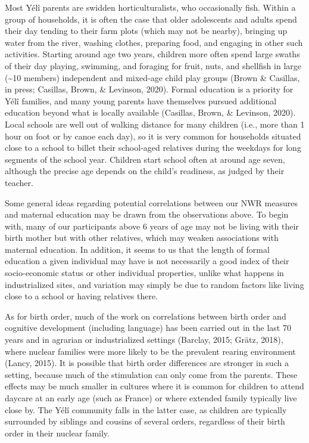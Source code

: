 \documentclass[
  english,
  ,man,floatsintext]{apa6}
\begin{document}
Most Yélî parents are swidden horticulturalists, who occasionally fish. Within a group of households, it is often the case that older adolescents and adults spend their day tending to their farm plots (which may not be nearby), bringing up water from the river, washing clothes, preparing food, and engaging in other such activities. Starting around age two years, children more often spend large swaths of their day playing, swimming, and foraging for fruit, nuts, and shellfish in large (\textasciitilde10 members) independent and mixed-age child play groups (Brown \& Casillas, in press; Casillas, Brown, \& Levinson, 2020). Formal education is a priority for Yélî families, and many young parents have themselves pursued additional education beyond what is locally available (Casillas, Brown, \& Levinson, 2020). Local schools are well out of walking distance for many children (i.e., more than 1 hour on foot or by canoe each day), so it is very common for households situated close to a school to billet their school-aged relatives during the weekdays for long segments of the school year. Children start school often at around age seven, although the precise age depends on the child's readiness, as judged by their teacher.

Some general ideas regarding potential correlations between our NWR measures and maternal education may be drawn from the observations above. To begin with, many of our participants above 6 years of age may not be living with their birth mother but with other relatives, which may weaken associations with maternal education.
In addition, it seems to us that the length of formal education a given individual may have is not necessarily a good index of their socio-economic status or other individual properties, unlike what happens in industrialized sites, and variation may simply be due to random factors like living close to a school or having relatives there.

As for birth order, much of the work on correlations between birth order and cognitive development (including language) has been carried out in the last 70 years and in agrarian or industrialized settings (Barclay, 2015; Grätz, 2018), where nuclear families were more likely to be the prevalent rearing environment (Lancy, 2015). It is possible that birth order differences are stronger in such a setting, because much of the stimulation can only come from the parents. These effects may be much smaller in cultures where it is common for children to attend daycare at an early age (such as France) or where extended family typically live close by. The Yélî community falls in the latter case, as children are typically surrounded by siblings and cousins of several orders, regardless of their birth order in their nuclear family.
\end{document}
